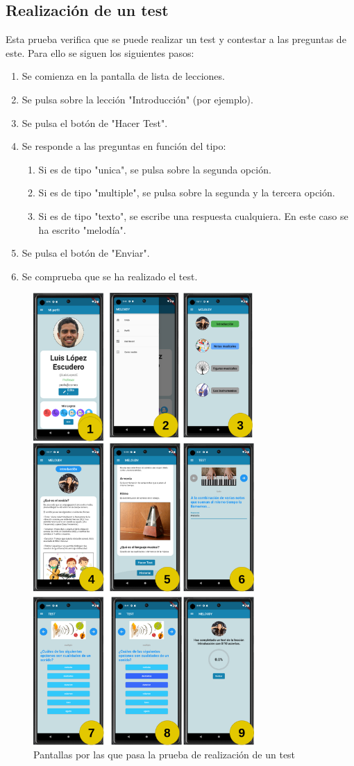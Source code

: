 \subsection{Realización de un test}
Esta prueba verifica que se puede realizar un test y contestar a las preguntas de este. Para ello se siguen los siguientes pasos:
\begin{enumerate}
    \item Se comienza en la pantalla de lista de lecciones.
    \item Se pulsa sobre la lección "Introducción" (por ejemplo).
    \item Se pulsa el botón de "Hacer Test".
    \item Se responde a las preguntas en función del tipo:
    \begin{enumerate}
        \item Si es de tipo "unica", se pulsa sobre la segunda opción.
        \item Si es de tipo "multiple", se pulsa sobre la segunda y la tercera opción.
        \item Si es de tipo "texto", se escribe una respuesta cualquiera. En este caso se ha escrito "melodía".
    \end{enumerate}
    \item Se pulsa el botón de "Enviar".
    \item Se comprueba que se ha realizado el test.
\end{enumerate}

\begin{figure}[H]
    \centering
    \includegraphics[width=0.75\textwidth]{imagenes/c8/testint3.png}
    \caption{Pantallas por las que pasa la prueba de realización de un test}
    \label{fig:prueba_creacion_usuario}
\end{figure}
